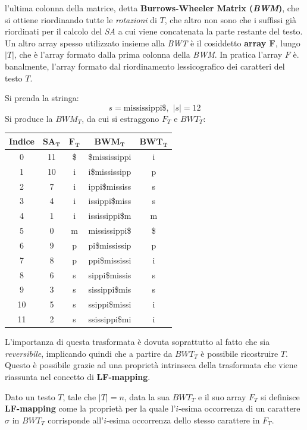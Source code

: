 l'ultima colonna della matrice, detta \textbf{Burrows-Wheeler Matrix
  (\textit{BWM})}, che si ottiene riordinando tutte le 
\textit{rotazioni} di $T$, che altro non sono che i suffissi già riordinati per
il calcolo del \textit{SA} a cui viene concatenata la parte restante del
testo.\\
Un altro array spesso utilizzato insieme alla \textit{BWT} è il cosiddetto
\textbf{array $\mathbf{F}$}, lungo $|T|$, che è l'array formato
dalla prima colonna della \textit{BWM}. In pratica l'array $F$ è.
banalmente, l'array formato dal riordinamento 
lessicografico dei caratteri del testo $T$.
\begin{esempio}
  Si prenda la stringa:
  \[s=\mbox{mississippi\$},\,\,|s|=12\]
  Si produce la $BWM_T$, da cui si estraggono $F_T$ e $BWT_T$:
  \begin{table}[H]
    \centering
    \footnotesize
    \begin{tabular}{c|c|c|c|c} 
      \textbf{Indice} & $\mathbf{SA_T}$ & $\mathbf{F_T}$ & $\mathbf{BWM_T}$
      & $\mathbf{BWT_T}$\\ 
      \hline
      0 & 11 & \$ & \$mississippi & i\\
      1 & 10 & i & i\$mississipp & p\\
      2 & 7 & i & ippi\$mississ & s\\
      3 & 4 & i & issippi\$miss & s\\
      4 & 1 & i & ississippi\$m & m\\
      5 & 0 & m & mississippi\$ & \$\\
      6 & 9 & p & pi\$mississip & p\\
      7 & 8 & p & ppi\$mississi & i\\
      8 & 6 & s & sippi\$missis & s\\
      9 & 3 & s & sissippi\$mis & s\\
      10 & 5 & s & ssippi\$missi & i\\
      11 & 2 & s & ssissippi\$mi & i\\
    \end{tabular}
  \end{table}
\end{esempio}
L'importanza di questa trasformata è dovuta soprattutto al fatto che sia
\textit{reversibile}, implicando quindi che a partire da $BWT_T$ è possibile
ricostruire $T$. Questo è possibile grazie ad una proprietà intrinseca della
trasformata che viene riassunta nel concetto di \textbf{LF-mapping}.
\begin{definizione}
  Dato un testo $T$, tale che $|T|=n$, data la sua $BWT_T$ e il suo array $F_T$
  si definisce \textbf{LF-mapping} come la proprietà per la quale l'$i$-esima
  occorrenza di un carattere $\sigma$ in $BWT_T$ corrisponde all'$i$-esima
  occorrenza dello stesso carattere in $F_T$.
\end{definizione}
